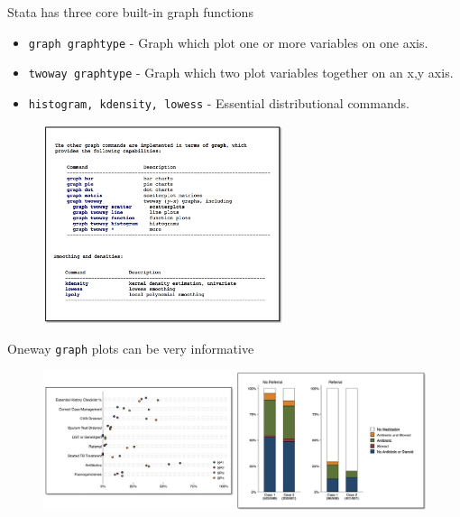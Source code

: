 \documentclass[aspectratio=169]{beamer}
\begin{document}
\begin{frame}{Stata has three core built-in graph functions}
	\begin{multicols}{2}	
			
			\begin{itemize}[<default overlay specification>]
			\item<1> \texttt{graph graphtype}
				\newline - Graph which plot one or more variables on one axis.
			\item<1>  \texttt{twoway graphtype}
				\newline - Graph which two plot variables together on an x,y axis.
			\item<1>  \texttt{histogram, kdensity, lowess}
				\newline - Essential distributional commands.
		\end{itemize}
		
		\begin{figure}
			\centering
			\includegraphics[width=70mm]{img/Function}
		\end{figure}
		
	\end{multicols}
\end{frame}


\begin{frame}{Oneway  \texttt{graph} plots can be very informative}
	
	\begin{figure}
		\centering
		\includegraphics[width=\linewidth]{img/Graph2}
	\end{figure}
	
\end{frame}
\end{document}
